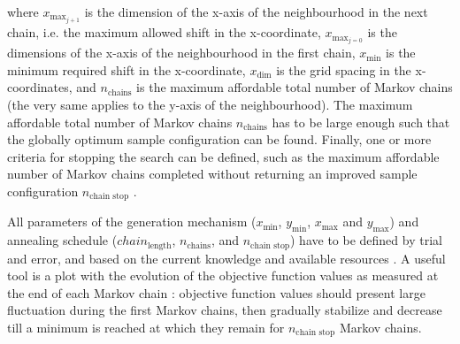 \noindent where $x_{\text{max}_{j + 1}}$ is the dimension of the x-axis of the neighbourhood in the next chain,
i.e. the maximum allowed shift in the x-coordinate, $x_{\text{max}_{j = 0}}$ is the dimensions of the x-axis
of the neighbourhood in the first chain, $x_\text{min}$ is the minimum required shift in the x-coordinate, 
$x_\text{dim}$ is the grid spacing in the x-coordinates, and $n_\text{chains}$ is the maximum affordable total 
number of Markov chains (the very same applies to the y-axis of the neighbourhood). The maximum affordable 
total number of Markov chains $n_\text{chains}$ has to be large enough such that the globally optimum sample 
configuration can be found. Finally, one or more criteria for stopping the search can be defined, such as the 
maximum affordable number of Markov chains completed without returning an improved sample configuration 
$n_\text{chain stop}$ \cite{Groenigen1999a}.




All parameters of the generation mechanism ($x_\text{min}$, $y_\text{min}$, $x_\text{max}$ and $y_\text{max}$) 
and annealing schedule ($chain_\text{length}$, $n_\text{chains}$, and $n_\text{chain stop}$) have to be defined 
by trial and error, and based on the current knowledge and available resources \cite{WebsterEtAl2013}. A useful 
tool is a plot with the evolution of the objective function values as measured at the end of each Markov chain 
\cite{LarkEtAl2003}: objective function values should present large fluctuation during the first Markov chains, 
then gradually stabilize and decrease till a minimum is reached at which they remain for $n_\text{chain stop}$ 
Markov chains.

